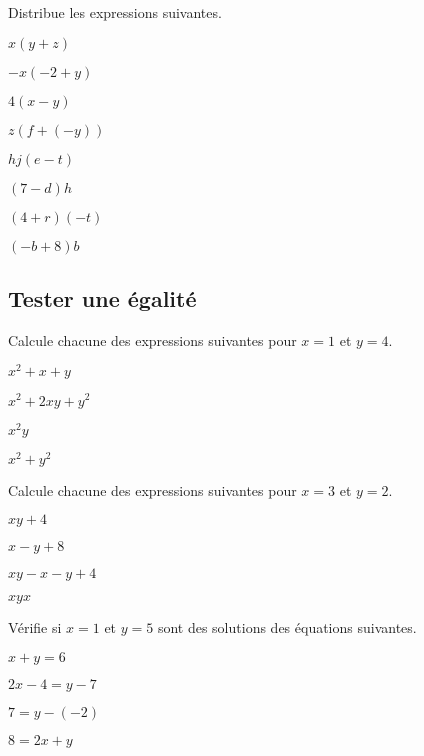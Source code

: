 \begin{exercicefr}
    Distribue les expressions suivantes.
    \begin{exerciceenum}
        \item $x(y + z)$
        \item $-x(-2+y)$
        \item $4(x - y)$
        \item $z(f + (-y))$
        \item $hj(e - t)$
        \item $(7 - d) h$
        \item $(4 + r) (-t)$
        \item $(- b+ 8) b$
    \end{exerciceenum}
\end{exercicefr}

\subsection{Tester une égalité}

\begin{exercicefr}
    Calcule chacune des expressions suivantes pour $x=1$ et $y=4$.
    \begin{exerciceenum}
        \item $x^2+x+y$
        \item $x^2+2xy+y^2$
        \item $x^2y$
        \item $x^2+y^2$
    \end{exerciceenum}

    Calcule chacune des expressions suivantes pour $x=3$ et $y=2$.
    \begin{exerciceenum}
        \item $xy+4$
        \item $x-y+8$
        \item $xy-x-y+4$
        \item $xyx$
    \end{exerciceenum}
\end{exercicefr}

\begin{exercicefr}
    Vérifie si $x = 1$ et $y= 5$ sont des solutions des équations suivantes.
    \begin{exerciceenumnoeq}
        \item $x + y = 6$
        \item $2x - 4 = y - 7$
        \item $7 = y - (-2)$
        \item $8 = 2x + y$
    \end{exerciceenumnoeq}
\end{exercicefr}

